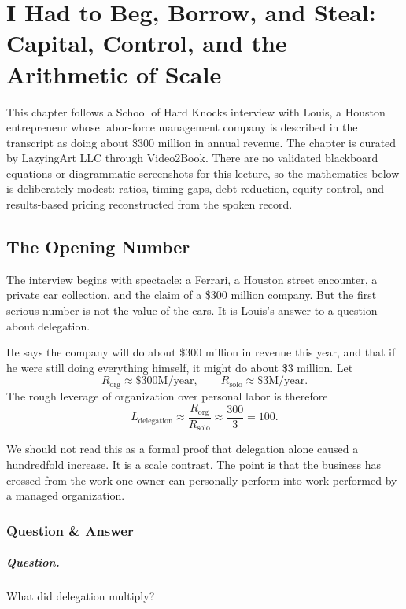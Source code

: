 \chapter{I Had to Beg, Borrow, and Steal: Capital, Control, and the Arithmetic of Scale}

This chapter follows a School of Hard Knocks interview with Louis, a Houston entrepreneur whose labor-force management company is described in the transcript as doing about \$300 million in annual revenue. The chapter is curated by LazyingArt LLC through Video2Book. There are no validated blackboard equations or diagrammatic screenshots for this lecture, so the mathematics below is deliberately modest: ratios, timing gaps, debt reduction, equity control, and results-based pricing reconstructed from the spoken record.

\section{The Opening Number}

The interview begins with spectacle: a Ferrari, a Houston street encounter, a private car collection, and the claim of a \$300 million company. But the first serious number is not the value of the cars. It is Louis's answer to a question about delegation.

He says the company will do about \$300 million in revenue this year, and that if he were still doing everything himself, it might do about \$3 million. Let
\[
R_{\mathrm{org}} \approx \$300\text{M/year},
\qquad
R_{\mathrm{solo}} \approx \$3\text{M/year}.
\]
The rough leverage of organization over personal labor is therefore
\begin{equation}
L_{\mathrm{delegation}}
   \approx
   \frac{R_{\mathrm{org}}}{R_{\mathrm{solo}}}
   \approx
   \frac{300}{3}
   =
   100.
\end{equation}

We should not read this as a formal proof that delegation alone caused a hundredfold increase. It is a scale contrast. The point is that the business has crossed from the work one owner can personally perform into work performed by a managed organization.

\subsection{Question \& Answer}

\paragraph{Question.} What did delegation multiply?


